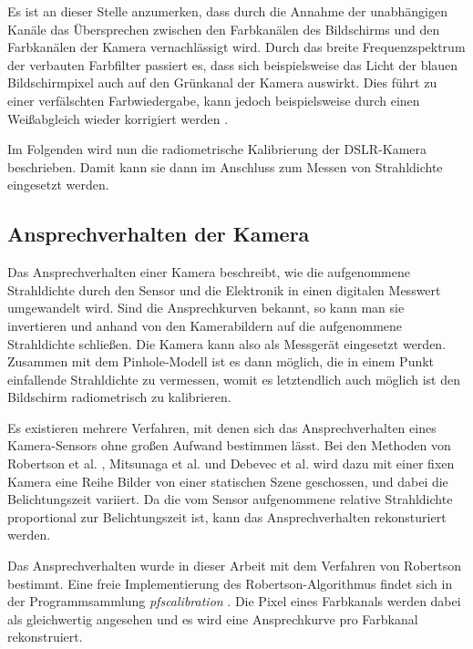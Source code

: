   Es ist an dieser Stelle anzumerken, dass durch die Annahme der unabhängigen Kanäle das Übersprechen zwischen den Farbkanälen des Bildschirms und den Farbkanälen der Kamera vernachlässigt wird.
  Durch das breite Frequenzspektrum der verbauten Farbfilter passiert es, dass sich beispielsweise das Licht der blauen Bildschirmpixel auch auf den Grünkanal der Kamera auswirkt.
  Dies führt zu einer verfälschten Farbwiedergabe, kann jedoch beispielsweise durch einen Weißabgleich wieder korrigiert werden \cite{Reinhard_2005}.

  Im Folgenden wird nun die radiometrische Kalibrierung der DSLR-Kamera beschrieben. Damit kann sie dann im Anschluss zum Messen von Strahldichte eingesetzt werden.

 \subsection{Ansprechverhalten der Kamera}  \label{dslr_calibration}  
  Das Ansprechverhalten einer Kamera beschreibt, wie die aufgenommene Strahldichte durch den Sensor und die Elektronik in einen digitalen Messwert umgewandelt wird. 
  Sind die Ansprechkurven bekannt, so kann man sie invertieren und anhand von den Kamerabildern auf die aufgenommene Strahldichte schließen. 
  Die Kamera kann also als Messgerät eingesetzt werden.
  Zusammen mit dem Pinhole-Modell ist es dann möglich, die in einem Punkt einfallende Strahldichte zu vermessen, womit es letztendlich auch möglich ist den Bildschirm radiometrisch zu kalibrieren.

    
   Es existieren mehrere Verfahren, mit denen sich das Ansprechverhalten eines Kamera-Sensors ohne großen Aufwand bestimmen lässt. 
   Bei den Methoden von Robertson et al. \cite{Robertson_1999}, Mitsunaga et al. \cite{Mitsunaga_1999} und Debevec et al. \cite{Debevec_1997} 
   wird dazu mit einer fixen Kamera eine Reihe Bilder von einer statischen Szene geschossen, und dabei die Belichtungszeit variiert. 
   Da die vom Sensor aufgenommene relative Strahldichte proportional zur Belichtungszeit ist, kann das Ansprechverhalten rekonsturiert werden. 

  Das Ansprechverhalten wurde in dieser Arbeit mit dem Verfahren von Robertson \cite{Robertson_1999} bestimmt. 
  Eine freie Implementierung des Robertson-Algorithmus findet sich in der Programmsammlung  \emph{pfscalibration} \cite{pfscalibration}.
  Die Pixel eines Farbkanals werden dabei als gleichwertig angesehen und es wird eine Ansprechkurve pro Farbkanal rekonstruiert.

